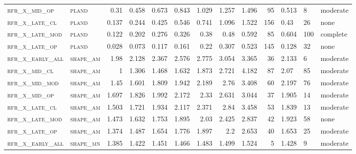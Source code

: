 \begin{landscape}
\begin{center}
\begin{footnotesize}
\begin{longtable}{llrrrrr|rrr}
\textsc{rfr\_x\_mid\_op   } & \textsc{pland     }   & 0.31    & 0.458   & 0.673   & 0.843    & 1.029    & 1.257    & 1.496    & 95     & 0.513         & 8             & moderate        \\
\textsc{rfr\_x\_late\_cl  } & \textsc{pland     }   & 0.137   & 0.244   & 0.425   & 0.546    & 0.741    & 1.096    & 1.522    & 156    & 0.43          & 26            & none        \\
\textsc{rfr\_x\_late\_mod } & \textsc{pland     }   & 0.122   & 0.202   & 0.276   & 0.326    & 0.38     & 0.48     & 0.592    & 85     & 0.604         & 100           & complete        \\
\textsc{rfr\_x\_late\_op  } & \textsc{pland     }   & 0.028   & 0.073   & 0.117   & 0.161    & 0.22     & 0.307    & 0.523    & 145    & 0.128         & 32            & none        \\
\textsc{rfr\_x\_early\_all} & \textsc{shape\_am }   & 1.98    & 2.128   & 2.367   & 2.576    & 2.775    & 3.054    & 3.365    & 36     & 2.133         & 6             & moderate        \\
\textsc{rfr\_x\_mid\_cl   } & \textsc{shape\_am }   & 1       & 1.306   & 1.468   & 1.632    & 1.873    & 2.721    & 4.182    & 87     & 2.07          & 85            & moderate        \\
\textsc{rfr\_x\_mid\_mod  } & \textsc{shape\_am }   & 1.45    & 1.601   & 1.809   & 1.942    & 2.189    & 2.76     & 3.408    & 60     & 2.197         & 76            & moderate        \\
\textsc{rfr\_x\_mid\_op   } & \textsc{shape\_am }   & 1.697   & 1.826   & 1.992   & 2.172    & 2.33     & 2.631    & 3.044    & 37     & 1.905         & 14            & moderate        \\
\textsc{rfr\_x\_late\_cl  } & \textsc{shape\_am }   & 1.503   & 1.721   & 1.934   & 2.117    & 2.371    & 2.84     & 3.458    & 53     & 1.839         & 13            & moderate        \\
\textsc{rfr\_x\_late\_mod } & \textsc{shape\_am }   & 1.473   & 1.632   & 1.753   & 1.895    & 2.03     & 2.425    & 2.837    & 42     & 1.923         & 58            & none        \\
\textsc{rfr\_x\_late\_op  } & \textsc{shape\_am }   & 1.374   & 1.487   & 1.654   & 1.776    & 1.897    & 2.2      & 2.653    & 40     & 1.653         & 25            & moderate        \\
\textsc{rfr\_x\_early\_all} & \textsc{shape\_mn }   & 1.385   & 1.422   & 1.451   & 1.466    & 1.483    & 1.499    & 1.524    & 5      & 1.428         & 9             & moderate        \\

\end{longtable}
\end{footnotesize}
\end{center}
\end{landscape}
